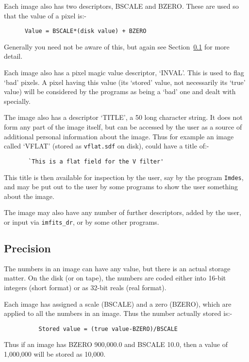 Each image also has two descriptors, BSCALE and BZERO. These are used
so that the value of a pixel is:-

\begin{verbatim}
      Value = BSCALE*(disk value) + BZERO \end{verbatim}

Generally you need not be aware of this, but again see
Section~\ref{se:im_prec} for more detail.

Each image also has a pixel magic value descriptor, `INVAL'.  This is
used to flag `bad' pixels. A pixel having this value (its `stored'
value, not necessarily its `true' value) will be considered by the
programs as being a `bad' one and dealt with specially.

The image also has a descriptor `TITLE', a 50 long character string. It
does not form any part of the image itself, but can be accessed by the
user as a source of additional personal information about the image.
Thus for example an image called `VFLAT' (stored as \verb|vflat.sdf| on
disk), could have a title of:- \begin{verbatim}
       `This is a flat field for the V filter' \end{verbatim}

This title is then available for inspection by the user, say by the
program \verb|Imdes|, and may be put out to the user by some programs
to show the user something about the image.

The image may also have any number of further descriptors, added by the
user, or input via \verb|imfits_dr|, or by some other programs.

\subsection{Precision} \label{se:im_prec}

The numbers in an image can have any value, but there is an actual
storage matter. On the disk (or on tape), the numbers are coded either
into 16-bit integers (short format) or as 32-bit reals (real format).

Each image has assigned a scale (BSCALE) and a zero (BZERO), which are
applied to all the numbers in an image. Thus the number actually stored
is:-

\begin{verbatim}
          Stored value = (true value-BZERO)/BSCALE
\end{verbatim}

Thus if an image has BZERO 900,000.0 and BSCALE 10.0, then a value of
1,000,000 will be stored as 10,000.

